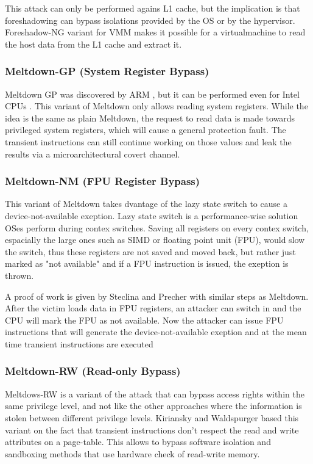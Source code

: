 \documentclass[sigconf]{acmart}
\begin{document}
This attack can only be performed agains L1 cache, but the implication is that foreshadowing can bypass isolations provided by the OS or by the hypervisor. Foreshadow-NG \cite{} variant for VMM makes it possible for a virtualmachine to read the host data from the L1 cache and extract it. 

\subsubsection{Meltdown-GP (System Register Bypass)}

Meltdown GP \cite{} was discovered by ARM \cite{}, but it can be performed even for Intel CPUs \cite{}. This variant of Meltdown only allows reading system registers. While the idea is the same as plain Meltdown, the request to read data is made towards privileged system registers, which will cause a general protection fault. The transient instructions can still continue working on those values and leak the results via a microarchitectural covert channel. 


\subsubsection{Meltdown-NM (FPU Register Bypass)}

This variant of Meltdown takes dvantage of the lazy state switch to cause a device-not-available exeption. Lazy state switch is a performance-wise solution OSes perform during contex switches. Saving all registers on every contex switch, espacially the large ones such as SIMD or floating point unit (FPU), would slow the switch, thus these registers are not saved and moved back, but rather just marked as "not available" and if a FPU instruction is issued, the exeption is thrown. 

A proof of work is given by Steclina and Precher \cite{} with similar steps as Meltdown. After the victim loads data in FPU registers, an attacker can switch in and the CPU will mark the FPU as not available. Now the attacker can issue FPU instructions that will generate the device-not-available exeption and at the mean time transient instructions are executed 

\subsubsection{ Meltdown-RW (Read-only Bypass)}

Meltdows-RW is a variant of the attack that can bypass access rights within the same privilege level, and not like the other approaches where the information is stolen between different privilege levels. Kiriansky and Waldspurger \cite{} based this variant on the fact that transient instructions don't respect the read and write attributes on a page-table. This allows to bypass software isolation and sandboxing methods that use hardware check of read-write memory.  
\end{document}
